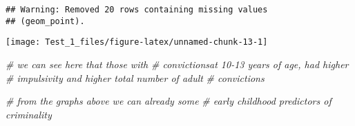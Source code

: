 \documentclass[]{tufte-handout}
\newenvironment{Shaded}{}{}
\newcommand{\CommentTok}[1]{\textcolor[rgb]{0.38,0.63,0.69}{\textit{#1}}}
\begin{document}
\begin{verbatim}
## Warning: Removed 20 rows containing missing values
## (geom_point).
\end{verbatim}

\texttt{[image: Test\_1\_files/figure-latex/unnamed-chunk-13-1]}

\begin{Shaded}
\begin{Highlighting}[]
\CommentTok{# we can see here that those with}
\CommentTok{# convictionsat 10-13 years of age, had higher}
\CommentTok{# impulsivity and higher total number of adult}
\CommentTok{# convictions}

\CommentTok{# from the graphs above we can already some}
\CommentTok{# early childhood predictors of criminality}
\end{Highlighting}
\end{Shaded}
\end{document}

